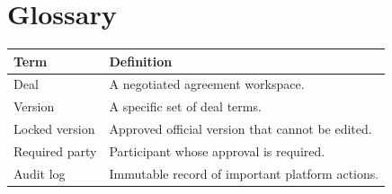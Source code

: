 \chapter{Glossary}
\begin{longtable}{p{}p{}}
\toprule
Term & Definition \\
\midrule
Deal & A negotiated agreement workspace. \\
Version & A specific set of deal terms. \\
Locked version & Approved official version that cannot be edited. \\
Required party & Participant whose approval is required. \\
Audit log & Immutable record of important platform actions. \\
\bottomrule
\end{longtable}
